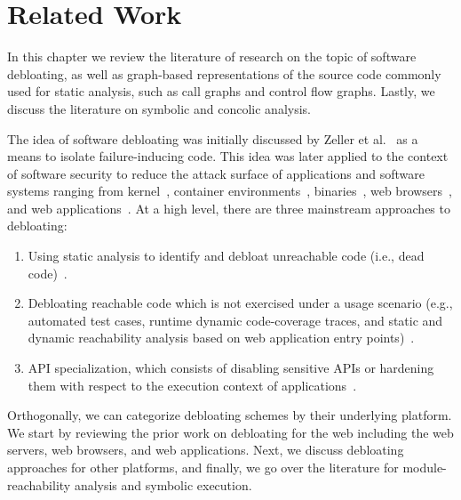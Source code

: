 \chapter{Related Work}
\label{chap:relatedwork}

In this chapter we review the literature of research on the topic of software debloating, as well as graph-based representations of the source code commonly used for static analysis, such as call graphs and control flow graphs. 
Lastly, we discuss the literature on symbolic and concolic analysis. 

The idea of software debloating was initially discussed by Zeller et al.~\cite{zeller2002simplifying} as a means to isolate failure-inducing code. 
This idea was later applied to the context of software security to reduce the attack surface of applications and software systems ranging from kernel~\cite{abubakar2021shard}, container environments~\cite{rastogi2017Cimplifier,259711}, binaries~\cite{hasan2022decap, redini2019b, heo2018effective,ghavamnia2020temporal, mishra2020saffire, koo2019configuration, quach2018debloating}, web browsers~\cite{snyder2017most, qian2020slimium}, and web applications~\cite{azad2019less, bulekov2021saphire, mininode, jahanshahi2020you}. 
At a high level, there are three mainstream approaches to debloating: 

\begin{enumerate}
    \item Using static analysis to identify and debloat unreachable code (i.e., dead code)~\cite{redini2019b, snyder2017most, quach2018debloating, mininode, 255308}.
    \item Debloating reachable code which is not exercised under a usage scenario (e.g., automated test cases, runtime dynamic code-coverage traces, and static and dynamic reachability analysis based on web application entry points)~\cite{lessismore, heo2018effective,qian2020slimium, koo2019configuration}.
    \item API specialization, which consists of disabling sensitive APIs or hardening them with respect to the execution context of applications~\cite{mishra2020saffire, saphire, jahanshahi2020you, mishra2021sgxpecial}. 
\end{enumerate}

Orthogonally, we can categorize debloating schemes by their underlying platform. 
We start by reviewing the prior work on debloating for the web including the web servers, web browsers, and web applications. 
Next, we discuss debloating approaches for other platforms, and finally, we go over the literature for module-reachability analysis and symbolic execution. 


